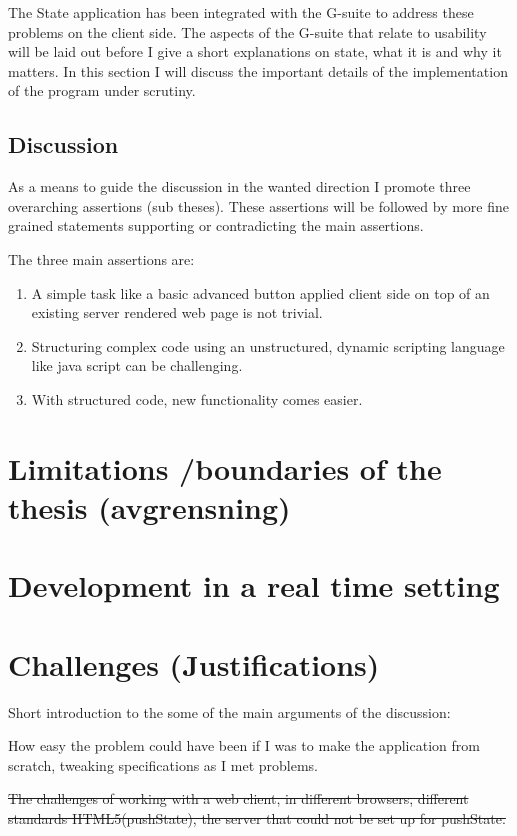 \documentclass[english]{ifimaster}
\begin{document}
The State application has been integrated with the G-suite to address these problems on the client side. The aspects of the G-suite that relate to usability will be laid out before I give a short explanations on state, what it is and why it matters. 
In this section I will discuss the important details of the implementation of the program under scrutiny. 

\subsection{Discussion}
As a means to guide the discussion in the wanted direction I promote three overarching assertions (sub theses). These assertions will be followed by more fine grained statements supporting or contradicting the main assertions. 

The three main assertions are:
\begin{enumerate}
  \item A simple task like a basic advanced button applied client side on top of an existing server rendered web page is not trivial.
  \item Structuring complex code using an unstructured, dynamic scripting language like java script can be challenging.
  \item With structured code, new functionality comes easier. 
\end{enumerate}

\section{Limitations /boundaries of the thesis (avgrensning)}

\section{Development in a real time setting}


\section{Challenges (Justifications)}
Short introduction to the some of the main arguments of the discussion: 

How easy the problem could have been if I was to make the application from scratch, tweaking specifications as I met problems.

\sout{The challenges of working with a web client, in different browsers, different standards HTML5(pushState), the server that could not be set up for pushState.}
\end{document}
